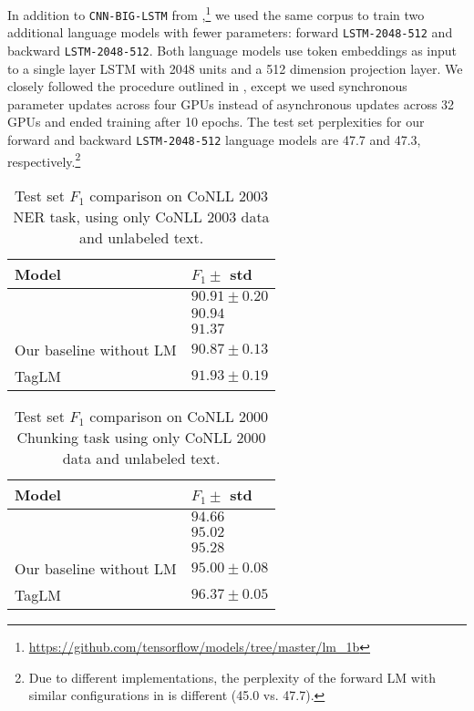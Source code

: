 \documentclass[11pt,a4paper]{article}
\begin{document}
In addition to \texttt{CNN-BIG-LSTM} from \citet{Jzefowicz2016ExploringTL},\footnote{\url{https://github.com/tensorflow/models/tree/master/lm_1b}} we used the same corpus to train two additional language models with fewer parameters: forward \texttt{LSTM-2048-512} and backward \texttt{LSTM-2048-512}.
Both language models use token embeddings as input to
a single layer LSTM with 2048 units and a 512 dimension projection layer.  
We closely followed the procedure outlined in \citet{Jzefowicz2016ExploringTL}, except we used synchronous parameter updates across four GPUs instead of asynchronous updates across 32 GPUs and ended training after 10 epochs.
The test set perplexities for our forward and backward \texttt{LSTM-2048-512} language models are 47.7 and 47.3, respectively.\footnote{Due to different implementations, the perplexity of the forward LM with similar configurations in \citet{Jzefowicz2016ExploringTL} is different (45.0 vs. 47.7).}

\begin{table}[t]
\begin{center}
\begin{tabular}{l|l}
\hline \hline
\bf Model & \bf $F_1 \pm$ std \\ \hline
\citet{chiu-nichols-2016} & $90.91 \pm 0.20$ \\
\citet{lample-EtAl:2016:N16-1} & $90.94$ \\
\citet{Ma2016EndtoendSL} & $91.37$ \\
\hline
Our baseline without LM   & $90.87 \pm 0.13$  \\
TagLM & $\mathbf{91.93 \pm 0.19}$ \\
\hline \hline
\end{tabular}
\end{center}
\caption{\label{2003-table} Test set $F_1$ comparison on CoNLL 2003 NER task,
using only CoNLL 2003 data and unlabeled text.}
\end{table}


\begin{table}[t]
\begin{center}
\begin{tabular}{l|l}
\hline \hline
\bf Model & \bf $F_1 \pm$ std \\ \hline
\citet{yang-transfer-iclr07} & $94.66$ \\
\citet{joint-many-iclr07} & $95.02$ \\
\citet{Sgaard2016DeepML} & $95.28$ \\
\hline
Our baseline without LM   & $95.00 \pm 0.08$  \\
TagLM & $\mathbf{96.37 \pm 0.05}$ \\
\hline \hline
\end{tabular}
\end{center}
\caption{\label{2000-table} Test set $F_1$ comparison on CoNLL 2000 Chunking task using only CoNLL 2000 data and unlabeled text.}
\end{table}
\end{document}

